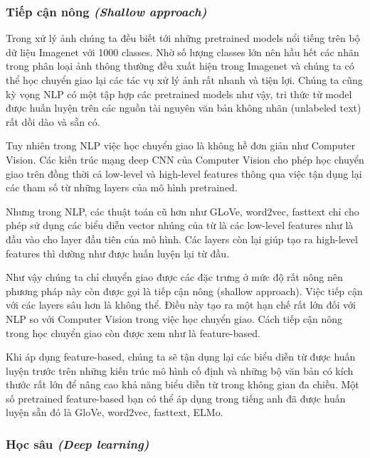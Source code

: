 \subsubsection{Tiếp cận nông \textit{(Shallow approach)}}
Trong xử lý ảnh chúng ta đều biết tới những pretrained models nổi tiếng trên bộ dữ liệu Imagenet với 1000 classes. Nhờ số lượng classes lớn nên hầu hết các nhãn trong phân loại ảnh thông thường đều xuất hiện trong Imagenet và chúng ta có thể học chuyển giao lại các tác vụ xử lý ảnh rất nhanh và tiện lợi. Chúng ta cũng kỳ vọng NLP có một tập hợp các pretrained models như vậy, tri thức từ model được huấn luyện trên các nguồn tài nguyên văn bản không nhãn (unlabeled text) rất dồi dào và sẵn có\cite{webpage20}.

Tuy nhiên trong NLP việc học chuyển giao là không hề đơn giản như Computer Vision. Các kiến trúc mạng deep CNN của Computer Vision cho phép học chuyển giao trên đồng thời cả low-level và high-level features thông qua việc tận dụng lại các tham số từ những layers của mô hình pretrained.

Nhưng trong NLP, các thuật toán cũ hơn như GLoVe, word2vec, fasttext chỉ cho phép sử dụng các biểu diễn vector nhúng của từ là các low-level features như là đầu vào cho layer đầu tiên của mô hình. Các layers còn lại giúp tạo ra high-level features thì dường như được huấn luyện lại từ đầu.

Như vậy chúng ta chỉ chuyển giao được các đặc trưng ở mức độ rất nông nên phương pháp này còn được gọi là tiếp cận nông (shallow approach). Việc tiếp cận với các layers sâu hơn là không thể. Điều này tạo ra một hạn chế rất lớn đối với NLP so với Computer Vision trong việc học chuyển giao. Cách tiếp cận nông trong học chuyển giao còn được xem như là feature-based.

Khi áp dụng feature-based, chúng ta sẽ tận dụng lại các biểu diễn từ được huấn luyện trước trên những kiến trúc mô hình cố định và những bộ văn bản có kích thước rất lớn để nâng cao khả năng biểu diễn từ trong không gian đa chiều. Một số pretrained feature-based bạn có thể áp dụng trong tiếng anh đã được huấn luyện sẵn đó là GloVe, word2vec, fasttext, ELMo.

\subsubsection{Học sâu \textit{(Deep learning)}}


